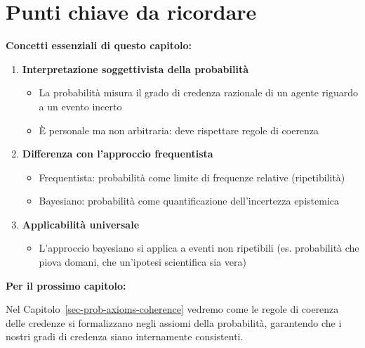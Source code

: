 \documentclass[
  italian,
  letterpaper,
  a4paper,
  11pt,
  open=any]{scrbook}
\providecommand{\tightlist}{%
  \setlength{\itemsep}{0pt}\setlength{\parskip}{0pt}}
\theoremstyle{plain}
\theoremstyle{definition}
\theoremstyle{definition}
\theoremstyle{remark}
\begin{document}
\section*{Punti chiave da ricordare}\label{punti-chiave-da-ricordare}


\begin{tcolorbox}[enhanced jigsaw, arc=.35mm, bottomrule=.15mm, bottomtitle=1mm, breakable, colback=white, colbacktitle=quarto-callout-important-color!10!white, colframe=quarto-callout-important-color-frame, coltitle=black, left=2mm, leftrule=.75mm, opacityback=0, opacitybacktitle=0.6, rightrule=.15mm, title=\textcolor{quarto-callout-important-color}{\faExclamation}\hspace{0.5em}{Importante}, titlerule=0mm, toprule=.15mm, toptitle=1mm]

\textbf{Concetti essenziali di questo capitolo:}

\begin{enumerate}
\def\labelenumi{\arabic{enumi}.}
\tightlist
\item
  \textbf{Interpretazione soggettivista della probabilità}

  \begin{itemize}
  \tightlist
  \item
    La probabilità misura il grado di credenza razionale di un agente
    riguardo a un evento incerto
  \item
    È personale ma non arbitraria: deve rispettare regole di coerenza
  \end{itemize}
\item
  \textbf{Differenza con l'approccio frequentista}

  \begin{itemize}
  \tightlist
  \item
    Frequentista: probabilità come limite di frequenze relative
    (ripetibilità)
  \item
    Bayesiano: probabilità come quantificazione dell'incertezza
    epistemica
  \end{itemize}
\item
  \textbf{Applicabilità universale}

  \begin{itemize}
  \tightlist
  \item
    L'approccio bayesiano si applica a eventi non ripetibili (es.
    probabilità che piova domani, che un'ipotesi scientifica sia vera)
  \end{itemize}
\end{enumerate}

\textbf{Per il prossimo capitolo:}

Nel Capitolo~\ref{sec-prob-axioms-coherence} vedremo come le regole di
coerenza delle credenze si formalizzano negli assiomi della probabilità,
garantendo che i nostri gradi di credenza siano internamente
consistenti.

\end{tcolorbox}
\end{document}

